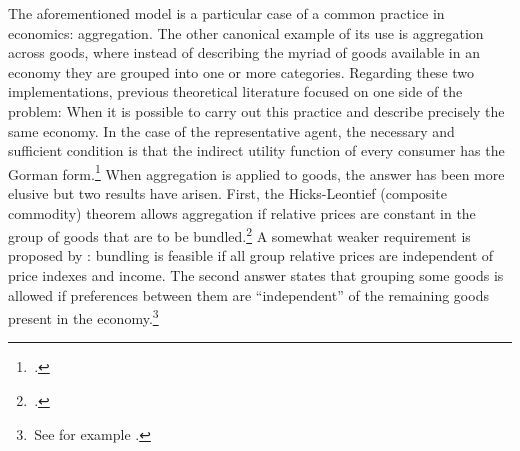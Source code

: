 \documentclass[english, a4paper, 12pt]{article}
\begin{document}
The aforementioned model is a particular case of a common practice in economics: aggregation. The other canonical example of its use is aggregation across goods, where instead of describing the myriad of goods available in an economy they are grouped into one or more categories. Regarding these two implementations, previous theoretical literature focused on one side of the problem: When it is possible to carry out this practice and describe precisely the same economy. In the case of the representative agent, the necessary and sufficient condition is that the indirect utility function of every consumer has the Gorman form.\footnote{\,\cite{Gorman53}.} When aggregation is applied to goods, the answer has been more elusive but two results have arisen. First, the Hicks-Leontief (composite commodity) theorem allows aggregation if relative prices are constant in the group of goods that are to be bundled.\footnote{\,\cite{Leontief36, HicksBook}.} A somewhat weaker requirement is proposed by \cite{Lewbel96}: bundling is feasible if all group relative prices are independent of price indexes and income. The second answer states that grouping some goods is allowed if preferences between them are ``independent'' of the remaining goods present in the economy.\footnote{\,See for example \cite{GormanSeparability}.} 
\end{document}
